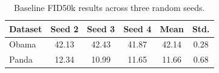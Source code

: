 \begin{table}[t]
\centering
\caption{Baseline FID50k results across three random seeds.}
\label{tab:baseline_fid}
\begin{tabular}{lccccc}
\hline
Dataset & Seed 2 & Seed 3 & Seed 4 & Mean & Std. \\
\hline
Obama & 42.13 & 42.43 & 41.87 & 42.14 & 0.28 \\
Panda & 12.34 & 10.99 & 11.65 & 11.66 & 0.68 \\
\hline
\end{tabular}
\end{table}
